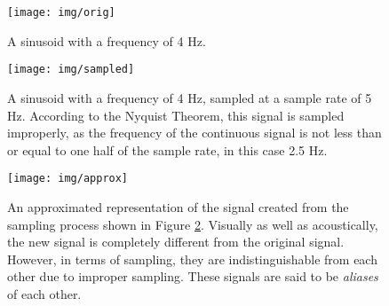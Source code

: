 \begin{figure}[p!]

  \centering

  \texttt{[image: img/orig]}

  \caption{A sinusoid with a frequency of 4 Hz.}

  \label{fig:orig}

\end{figure}

\begin{figure}[p!]

  \centering

  \texttt{[image: img/sampled]}

  \caption{A sinusoid with a frequency of 4 Hz, sampled at a sample rate of 5 Hz. According to the Nyquist Theorem, this signal is sampled improperly, as the frequency of the continuous signal is not less than or equal to one half of the sample rate, in this case 2.5 Hz. }

  \label{fig:sampled}

\end{figure}

\begin{figure}[p!]

  \centering

  \texttt{[image: img/approx]}

  \caption{An approximated representation of the signal created from the sampling process shown in Figure \ref{fig:sampled}. Visually as well as acoustically, the new signal is completely different from the original signal. However, in terms of sampling, they are indistinguishable from each other due to improper sampling. These signals are said to be \emph{aliases} of each other.}

  \label{fig:approx}

\end{figure}
